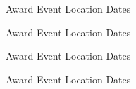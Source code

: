 



\begin{cvhonors}

  \cvhonor
    {Award} %
    {Event} %
    {Location} %
    {Dates} %

  \cvhonor
    {Award} %
    {Event} %
    {Location} %
    {Dates} %

\end{cvhonors}




\begin{cvhonors}

  \cvhonor
    {Award} %
    {Event} %
    {Location} %
    {Dates} %

  \cvhonor
    {Award} %
    {Event} %
    {Location} %
    {Dates} %

\end{cvhonors}



